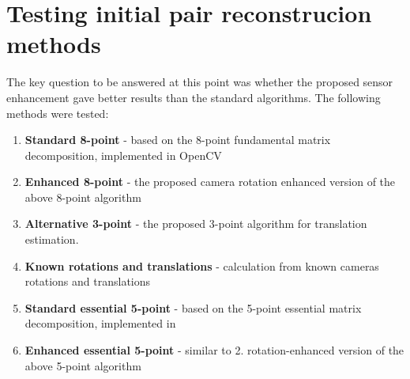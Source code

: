 \section{Testing initial pair reconstrucion methods} \label{sec:Testin2Views}
The key question to be answered at this point was whether the proposed sensor enhancement gave better results than the standard algorithms.
The following methods were tested:
\begin{enumerate}
\item \textbf{Standard 8-point} - based on the 8-point fundamental matrix decomposition, implemented in OpenCV
\item \textbf{Enhanced 8-point} - the proposed camera rotation enhanced version of the above 8-point algorithm
\item \textbf{Alternative 3-point} - the proposed 3-point algorithm for translation estimation.
\item \textbf{Known rotations and translations} - calculation from known cameras rotations and translations
\item \textbf{Standard essential 5-point} - based on the 5-point essential matrix decomposition, implemented in \cite{website:relativePoseLibrary}
\item \textbf{Enhanced essential 5-point} - similar to 2. rotation-enhanced version of the above 5-point algorithm
\end{enumerate}
